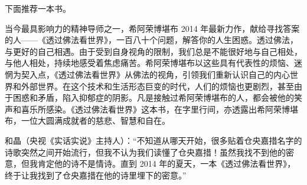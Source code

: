 下面推荐一本书。

\begin{book}[《透过佛法看世界》]
    当今最具影响力的精神导师之一，希阿荣博堪布 2014 年最新力作，献给寻找答案的人——《透过佛法看世界》，一百八十个问题，解答你的人生困惑。透过佛法，与更好的自己相遇。由于受到自身视角的限制，我们总是不能很好地与自己相处，与他人相处，持续地感受着焦虑痛苦。希阿荣博堪布以这些具有代表性的烦恼、迷惘为契入点，《透过佛法看世界》从佛法的视角，引领我们重新认识自己的内心世界和外部世界。在这个技术和生活形态巨变的时代，人们的烦恼也更剧烈，甚至由于困惑和矛盾，陷入抑郁症的阴影。凡是接触过希阿荣博堪布的人，都会被他的笑声和喜乐所感染。《透过佛法看世界》这本书，在字里行间，亦透露出希阿荣博堪布，一位大圆满成就者的慈悲、智慧和自在。

    和晶（央视《实话实说》主持人）：“不知道从哪天开始，很多贴着仓央嘉措名字的诗歌突然之间开始流行，但我不认为我们读懂了仓央嘉措！虽然我找不到他的密意，但我肯定他的诗不是情诗。直到 2014 年的夏天，一本《透过佛法看世界》，终于让我找到了仓央嘉措在他的诗里埋下的密意。”
\end{book}
